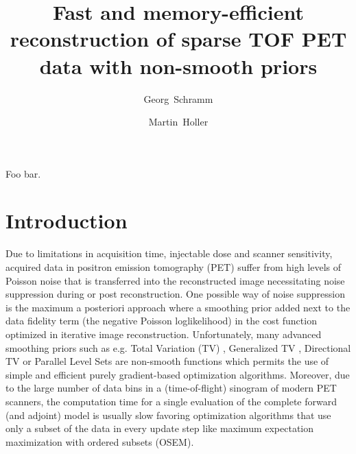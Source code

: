 \documentclass[11pt,twocolumn,twoside]{article}
\begin{document}
\title{Fast and memory-efficient reconstruction of sparse TOF PET data with non-smooth priors} 

\author[1]{Georg~Schramm}
\author[2]{Martin~Holler}



\maketitle
\thispagestyle{fancy}





\begin{customabstract}
Foo bar.
\end{customabstract}


\section{Introduction}

Due to limitations in acquisition time, injectable dose and scanner sensitivity,
acquired data in positron emission tomography (PET) suffer from high levels of
Poisson noise that is transferred into the reconstructed image necessitating
noise suppression during or post reconstruction.
One possible way of noise suppression is the maximum a posteriori approach
where a smoothing prior added next to the data fidelity term (the negative
Poisson loglikelihood) in the cost function optimized in iterative image 
reconstruction.
Unfortunately, many advanced smoothing priors such as e.g. Total Variation (TV) \cite{Rudin1992},
Generalized TV \cite{Bredies2010}, Directional TV \cite{Ehrhardt2016} or Parallel Level 
Sets \cite{Ehrhardt2016a,Schramm2017} are non-smooth 
functions which permits the use of simple and efficient purely gradient-based
optimization algorithms.
Moreover, due to the large number of data bins in a (time-of-flight) sinogram
of modern PET scanners, the computation time for a single evaluation of the complete
forward (and adjoint) model is usually slow favoring optimization algorithms that
use only a subset of the data in every update step like maximum expectation maximization
with ordered subsets (OSEM).
\end{document}
